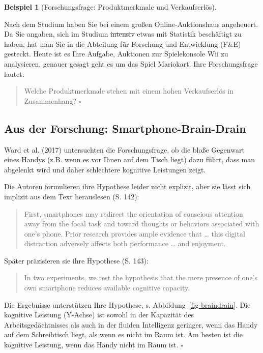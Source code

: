 \documentclass[
  letterpaper,
  twoside,
  open=any]{scrbook}
\theoremstyle{definition}
\theoremstyle{definition}
\theoremstyle{definition}
\newtheorem{example}{Beispiel}[chapter]
\theoremstyle{remark}
\begin{document}
\begin{example}[Forschungsfrage: Produktmerkmale und
Verkaufserlös]\protect\hypertarget{exm-fofrage2}{}\label{exm-fofrage2}

Nach dem Studium haben Sie bei einem großen Online-Auktionshaus
angeheuert. Da Sie angaben, sich im Studium \st{intensiv} etwas mit
Statistik beschäftigt zu haben, hat man Sie in die Abteilung für
Forschung und Entwicklung (F\&E) gesteckt. Heute ist es Ihre Aufgabe,
Auktionen zur Spielekonsole Wii zu analysieren, genauer gesagt geht es
um das Spiel Mariokart. Ihre Forschungsfrage lautet:

\begin{quote}
Welche Produktmerkmale stehen mit einem hohen Verkaufserlös in
Zusammenhang? \(\square\)
\end{quote}

\end{example}

\subsection{Aus der Forschung:
Smartphone-Brain-Drain}\label{aus-der-forschung-smartphone-brain-drain-1}

Ward et al. (2017) untersuchten die Forschungsfrage, ob die bloße
Gegenwart eines Handys (z.B. wenn es vor Ihnen auf dem Tisch liegt) dazu
führt, dass man abgelenkt wird und daher schlechtere kognitive
Leistungen zeigt.

Die Autoren formulieren ihre Hypothese leider nicht explizit, aber sie
lässt sich implizit aus dem Text herauslesen (S. 142):

\begin{quote}
First, smartphones may redirect the orientation of conscious attention
away from the focal task and toward thoughts or behaviors associated
with one's phone. Prior research provides ample evidence that \ldots{}
this digital distraction adversely affects both performance \ldots{} and
enjoyment.
\end{quote}

Später präzisieren sie ihre Hypothese (S. 143):

\begin{quote}
In two experiments, we test the hypothesis that the mere presence of
one's own smartphone reduces available cognitive capacity.
\end{quote}

Die Ergebnisse unterstützen Ihre Hypothese, s.
Abbildung~\ref{fig-braindrain}. Die kognitive Leistung (Y-Achse) ist
sowohl in der Kapazität des Arbeitsgedächtnisses als auch in der fluiden
Intelligenz geringer, wenn das Handy auf dem Schreibtisch liegt, als
wenn es nicht im Raum ist. Am besten ist die kognitive Leistung, wenn
das Handy nicht im Raum ist. \(\square\)
\end{document}
